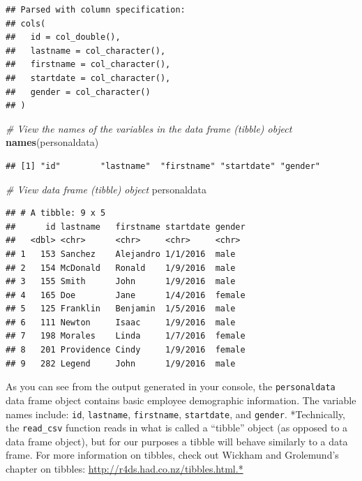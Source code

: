 \documentclass[]{book}
\newenvironment{Shaded}{\begin{snugshade}}{\end{snugshade}}
\newcommand{\KeywordTok}[1]{\textcolor[rgb]{0.13,0.29,0.53}{\textbf{#1}}}
\newcommand{\CommentTok}[1]{\textcolor[rgb]{0.56,0.35,0.01}{\textit{#1}}}
\newcommand{\NormalTok}[1]{#1}
\begin{document}
\begin{verbatim}
## Parsed with column specification:
## cols(
##   id = col_double(),
##   lastname = col_character(),
##   firstname = col_character(),
##   startdate = col_character(),
##   gender = col_character()
## )
\end{verbatim}

\begin{Shaded}
\begin{Highlighting}[]
\CommentTok{# View the names of the variables in the data frame (tibble) object}
\KeywordTok{names}\NormalTok{(personaldata)}
\end{Highlighting}
\end{Shaded}

\begin{verbatim}
## [1] "id"        "lastname"  "firstname" "startdate" "gender"
\end{verbatim}

\begin{Shaded}
\begin{Highlighting}[]
\CommentTok{# View data frame (tibble) object}
\NormalTok{personaldata}
\end{Highlighting}
\end{Shaded}

\begin{verbatim}
## # A tibble: 9 x 5
##      id lastname   firstname startdate gender
##   <dbl> <chr>      <chr>     <chr>     <chr> 
## 1   153 Sanchez    Alejandro 1/1/2016  male  
## 2   154 McDonald   Ronald    1/9/2016  male  
## 3   155 Smith      John      1/9/2016  male  
## 4   165 Doe        Jane      1/4/2016  female
## 5   125 Franklin   Benjamin  1/5/2016  male  
## 6   111 Newton     Isaac     1/9/2016  male  
## 7   198 Morales    Linda     1/7/2016  female
## 8   201 Providence Cindy     1/9/2016  female
## 9   282 Legend     John      1/9/2016  male
\end{verbatim}

As you can see from the output generated in your console, the
\texttt{personaldata} data frame object contains basic employee
demographic information. The variable names include: \texttt{id},
\texttt{lastname}, \texttt{firstname}, \texttt{startdate}, and
\texttt{gender}. *Technically, the \texttt{read\_csv} function reads in
what is called a ``tibble'' object (as opposed to a data frame object),
but for our purposes a tibble will behave similarly to a data frame. For
more information on tibbles, check out Wickham and Grolemund's
\citeyearpar{wickham2017} chapter on tibbles:
\url{http://r4ds.had.co.nz/tibbles.html.*}
\end{document}
